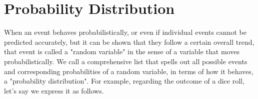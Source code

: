 \documentclass{ltjbook}
\begin{document}
\section{Probability Distribution}
When an event behaves probabilistically, or even if individual events cannot be predicted accurately, but it can be shown that they follow a certain overall trend, that event is called a "random variable" in the sense of a variable that moves probabilistically.
We call a comprehensive list that spells out all possible events and corresponding probabilities of a random variable, in terms of how it behaves, a "probability distribution".
For example, regarding the outcome of a dice roll, let's say we express it as follows.

\end{document}
